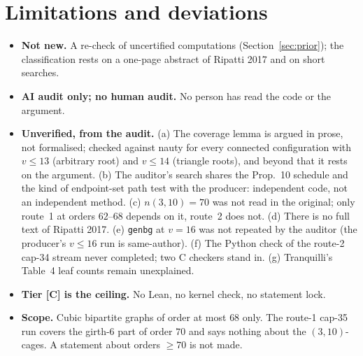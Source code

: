 \documentclass[10pt]{article}
\newcommand{\tier}[1]{\textsf{[#1]}}
\newcommand{\tC}{\tier{C}}
\begin{document}
\section{Limitations and deviations}\label{sec:lim}
\begin{itemize}\itemsep=1pt
\item \textbf{Not new.} A re-check of uncertified computations (Section~\ref{sec:prior}); the classification rests on a one-page abstract of Ripatti 2017 and on short searches.
\item \textbf{AI audit only; no human audit.} No person has read the code or the argument.
\item \textbf{Unverified, from the audit.} (a) The coverage lemma is argued in prose, not formalised; checked against nauty for every connected configuration with $v\le13$ (arbitrary root) and $v\le14$ (triangle roots), and beyond that it rests on the argument. (b) The auditor's search shares the Prop.~10 schedule and the kind of endpoint-set path test with the producer: independent code, not an independent method. (c) $n(3,10)=70$ was not read in the original; only route~1 at orders $62$--$68$ depends on it, route~2 does not. (d) There is no full text of Ripatti 2017. (e) \texttt{genbg} at $v=16$ was not repeated by the auditor (the producer's $v\le16$ run is same-author). (f) The Python check of the route-2 cap-34 stream never completed; two C checkers stand in. (g) Tranquilli's Table~4 leaf counts remain unexplained.
\item \textbf{Tier \tC{} is the ceiling.} No Lean, no kernel check, no statement lock.
\item \textbf{Scope.} Cubic bipartite graphs of order at most $68$ only. The route-1 cap-35 run covers the girth-6 part of order $70$ and says nothing about the $(3,10)$-cages. A statement about orders $\ge70$ is not made.

\end{itemize}
\end{document}

